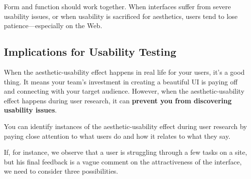 Form and function should work together. When interfaces suffer from severe usability issues, or when usability is sacrificed for aesthetics, users tend to lose patience---especially on the Web.

\subsection{Implications for Usability Testing} %
\label{sub:implications_for_usability_testing}

When the aesthetic-usability effect happens in real life for your users, it’s a good thing. It means your team’s investment in creating a beautiful UI is paying off and connecting with your target audience. 
However, when the aesthetic-usability effect happens during user research, it can \textbf{prevent you from discovering usability issues}.

You can identify instances of the aesthetic-usability effect during user research by paying close attention to what users do and how it relates to what they say.

If, for instance, we observe that a user is struggling through a few tasks on a site, but his final feedback is a vague comment on the attractiveness of the interface, we need to consider three possibilities.

